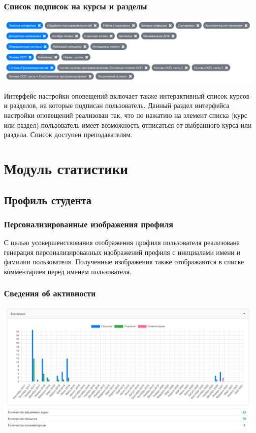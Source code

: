 \documentclass[12pt, a4paper, oneside]{article}
\begin{document}
\subsubsection{Список подписок на курсы и разделы}
\begin{center}
    \includegraphics[scale=0.25]{courses-contests-subscriptions}
\end{center}

Интерфейс настройки оповещений включает также интерактивный список курсов и разделов, на которые подписан пользователь. Данный раздел интерфейса настройки оповещений реализован так, что по нажатию на элемент списка (курс или раздел) пользователь имеет возможность отписаться от выбранного курса или раздела. Список доступен преподавателям.
\newpage

\section{Модуль статистики}
\subsection{Профиль студента}
\subsubsection{Персонализированные изображения профиля}
С целью усовершенствования отображения профиля пользователя реализована генерация персонализированных изображений профиля с инициалами имени и фамилии пользователя. Полученные изображения также отображаются в списке комментариев перед именем пользователя.
\subsubsection{Сведения об активности}
\begin{center}
    \includegraphics[scale=0.25]{account-activity}
\end{center}
\end{document}
